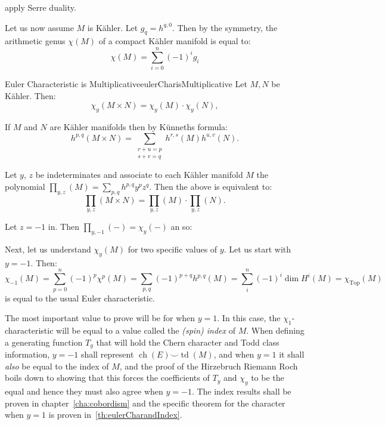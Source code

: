 \documentclass{book}
\newenvironment{Proof}[1][]
  {\begin{ProofTcb}[#1]}
  {\end{ProofTcb}}
\newcommand{\ch}{{\operatorname{ch}}}
\newcommand{\Top}{{\operatorname{Top}}}
\newcommand{\td}{{\operatorname{td}}}
\renewcommand{\ch}{{\operatorname{ch}}}
\begin{document}
\begin{Proof}
 apply Serre duality.
\end{Proof}


Let us now assume $M$ is K\"ahler. Let $g_q = h^{q,0}$. Then by the symmetry, the arithmetic genus $\chi(M)$
of a compact K\"ahler manifold is equal to:
\[
  \chi(M) = \sum_{i=0}^n (-1)^ig_i
\]
\begin{prop}{Euler Characteristic is Multiplicative}{eulerCharisMultiplicative}
  Let $M,N$ be K\"ahler. Then:
  \[
    \chi_y(M \times N) = \chi_y(M) \cdot \chi_y(N),
\]
\end{prop}

\begin{Proof}
If $M$ and $N$ are K\"ahler manifolds then by K\"unneths formula:
\[
    h^{p,q}(M \times N) = \sum_{\substack{r+u=p \\ s+v=q}} h^{r,s}(M) h^{u,v}(N).
\]

Let $y$, $z$ be indeterminates and associate to each K\"ahler manifold $M$ the polynomial $\prod_{y,z}(M)
= \sum_{p,q} h^{p,q} y^p z^q$. Then the above is equivalent to:
\[
    \prod_{y,z}(M \times N) = \prod_{y,z}(M) \cdot \prod_{y,z}(N).
\]

Let $z = -1$ in. Then $\prod_{y,-1}(-) = \chi_y(-)$ an so:

\end{Proof}
Next, let us understand $\chi_y(M)$ for two specific values of $y$. Let us start with $y = -1$. Then:
\[
  \chi_{-1}(M) = \sum_{p=0}^n (-1)^p\chi^p(M) = \sum_{p,q} (-1)^{p+q} h^{p,q}(M) = \sum_i^n (-1)^i \dim H^i(M)
  = \chi_\Top(M)
\]
is equal to the usual Euler characteristic.

The most important value to prove will be for when $y = 1$. In this case, the $\chi_{1}$-characteristic will
be equal to a value called the \emph{(spin) index} of $M$. When defining a generating function $T_y$ that
will hold the Chern character and Todd class information, $y = -1$ shall represent $\ch(E)\smile \td(M)$, and when $y = 1$ it shall \emph{also} be equal to the
index of $M$, and the proof of the Hirzebruch Riemann Roch boils down to showing that this forces the
coefficients of $T_y$ and $\chi_y$ to be the equal and hence they must also agree when $y = -1$. The index results
shall be proven in chapter~\ref{cha:cobordism} and the specific theorem for the character when $y=1$ is proven
in~\cref{th:eulerCharandIndex}.
\end{document}

